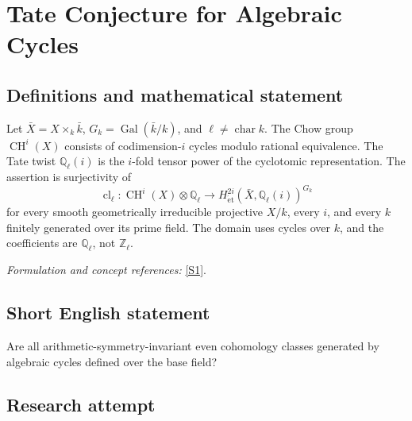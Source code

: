 \documentclass[11pt,a4paper]{article}
\newcommand{\Z}{\mathbb{Z}}
\newcommand{\Q}{\mathbb{Q}}
\newcommand{\sref}[2]{\hyperlink{source:#1:#2}{[S#2]}}
\newif\ifshowcatalogue
\newcommand{\cataloguescope}[1]{\ifshowcatalogue
 \paragraph{Exact scope in the supplied catalogue.}
 \begin{quote}\small #1\end{quote}\fi}
\begin{document}
\setcounter{section}{0}
\clearpage
\section*{\texorpdfstring{Tate Conjecture for Algebraic Cycles}{Tate Conjecture for Algebraic Cycles}}\label{statement}
\subsection{Definitions and mathematical statement}
Let $\bar X=X\times_k\bar k$, $G_k=\operatorname{Gal}(\bar k/k)$, and $\ell\ne\operatorname{char}k$. The Chow group $\operatorname{CH}^i(X)$ consists of codimension-$i$ cycles modulo rational equivalence. The Tate twist $\Q_\ell(i)$ is the $i$-fold tensor power of the cyclotomic representation. The assertion is surjectivity of
\[
 \operatorname{cl}_\ell:\operatorname{CH}^i(X)\otimes\Q_\ell
 \longrightarrow H^{2i}_{\mathrm{\acute et}}(\bar X,\Q_\ell(i))^{G_k}
\]
for every smooth geometrically irreducible projective $X/k$, every $i$, and every $k$ finitely generated over its prime field. The domain uses cycles over $k$, and the coefficients are $\Q_\ell$, not $\Z_\ell$.
\par\smallskip\textit{Formulation and concept references:} \sref{statement}{1}.
\cataloguescope{For every smooth geometrically irreducible projective variety X over a field k finitely generated over its prime field, every codimension i, and every prime l different from char(k), prove that the l-adic cycle-class map from codimension-i algebraic cycle classes defined over k, tensored with Q\_l, is surjective onto H\textasciicircum{}(2i)(X\_bar,Q\_l(i))\textasciicircum{}Gal(k\_bar/k).}
\subsection{Short English statement}
Are all arithmetic-symmetry-invariant even cohomology classes generated by algebraic cycles defined over the base field?
\subsection{Research attempt}
\end{document}
